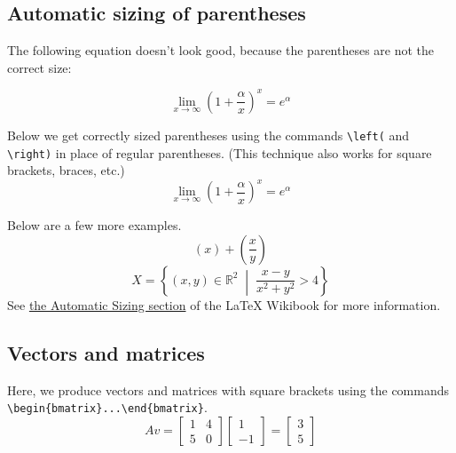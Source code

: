 \documentclass[11pt]{amsart}
\theoremstyle{theorem} %
\theoremstyle{definition}                  %
\theoremstyle{example}                       %
\theoremstyle{remark}                       %
\numberwithin{equation}{section}
\newcommand{\R}{\mathbb{R}}
\begin{document}
\subsection{Automatic sizing of parentheses}
The following equation doesn't look  good, because the parentheses
are not the correct size: 

\begin{equation}
\lim_{x \rightarrow \infty} (1+\frac{\alpha}{x})^x = e^\alpha
\end{equation}

Below we get correctly sized parentheses using the commands
\verb,\left(, and \verb,\right), in place of regular
parentheses. (This technique also works for 
square brackets, braces, etc.)
\begin{equation}
\lim_{x \rightarrow \infty} \left(1+\frac{\alpha}{x}\right)^x = e^\alpha
\end{equation}

Below are a few more examples.
\begin{equation}
\left( x \right) + \left( \frac{x}{y} \right) 
\end{equation}
\begin{equation}
X=\left\{(x,y)\in \R^2\; \middle|\; \frac{x-y}{x^2+y^2}>4\right\}
\end{equation}
See \href{https://en.wikibooks.org/wiki/LaTeX/Mathematics#Automatic_sizing}{the Automatic Sizing section} of the LaTeX Wikibook \cite{wikibook} for more information.



\subsection{Vectors and matrices}

Here, we produce vectors and matrices with square brackets using the commands
\verb,\begin{bmatrix}...\end{bmatrix},.
\begin{equation}
Av = \begin{bmatrix} 1 & 4 \\ 5 & 0 \end{bmatrix} \begin{bmatrix} 1 \\ -1\end{bmatrix}
   = \begin{bmatrix} 3 \\ 5\end{bmatrix} 
\end{equation}
\end{document}

